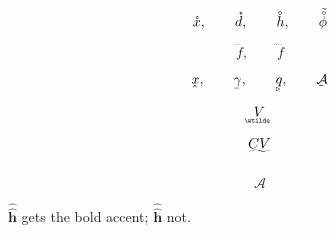 \documentclass{article}
\begin{document}
\[ \ring{x},\qquad
   \accentset{\star}{d},\qquad
   \accentset{\diamond}{h},\qquad
   \tilde{\accentset{\circ}{\phi}} \]

\[ \dddot{f},\qquad \ddddot{f} \]

\[ \underaccent{\hat}{x},\qquad
   \underaccent{\bar}{\gamma},\qquad
   \underaccent{\triangleright}{q},\qquad
   \underaccent{\tilde}{\mathcal{A}} \]

\[ \underaccent{\wtilde}{V} \]

\[ \undertilde{CV} \]

\[ \hat{\hat{\mathcal{A}}} \]

$\mathbf{\hat{\hat h}}$ gets the bold accent;
$\hat{\hat{\mathbf{h}}}$ not.
\end{document}
